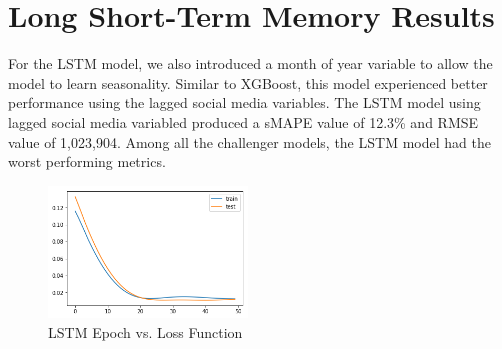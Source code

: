 \documentclass[12pt,oneside]{chicagocapstone}
\begin{document}
\hypertarget{long-short-term-memory-results}{%
\section*{Long Short-Term Memory Results}\label{long-short-term-memory-results}}

For the LSTM model, we also introduced a month of year variable to allow the model to learn seasonality. Similar to XGBoost, this model experienced better performance using the lagged social media variables. The LSTM model using lagged social media variabled produced a sMAPE value of 12.3\% and RMSE value of 1,023,904. Among all the challenger models, the LSTM model had the worst performing metrics.
\begin{figure}

{\centering \includegraphics[width=200px,angle = 0, scale=1.5]{figure/image17} 

}

\caption{LSTM Epoch vs. Loss Function}\label{fig:image17}
\end{figure}
\end{document}
